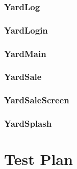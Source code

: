 \documentclass{report}
\begin{document}
	\subsection{YardLog}

	\subsection{YardLogin}

	\subsection{YardMain}

	\subsection{YardSale}

	\subsection{YardSaleScreen}

	\subsection{YardSplash}

\chapter{Test Plan}
\end{document}
